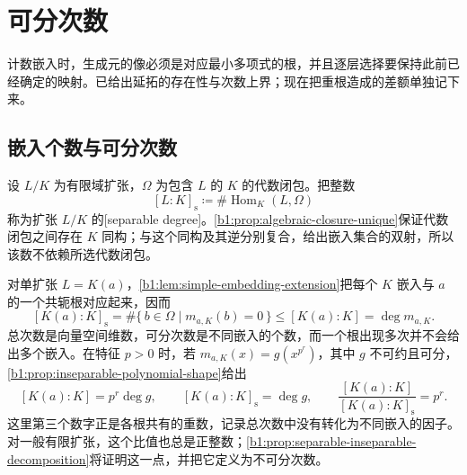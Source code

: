 
\section{可分次数}
\label{b1:sec:1602}


%
%

计数嵌入时，生成元的像必须是对应最小多项式的根，并且逐层选择要保持此前已经确定的映射。已给出延拓的存在性与次数上界；现在把重根造成的差额单独记下来。

\subsection{嵌入个数与可分次数}
\label{b1:subsec:1602:01}

\begin{definition}\label{b1:def:separable-degree}
	设 \(L/K\) 为有限域扩张，\(\Omega\) 为包含 \(L\) 的 \(K\) 的代数闭包。把整数
	\[
		[L:K]_{\mathrm s}\coloneqq\#\operatorname{Hom}_K(L,\Omega)
	\]
	称为扩张 \(L/K\) 的[separable degree]。\cref{b1:prop:algebraic-closure-unique}保证代数闭包之间存在 \(K\) 同构；与这个同构及其逆分别复合，给出嵌入集合的双射，所以该数不依赖所选代数闭包。
\end{definition}

对单扩张 \(L=K(a)\)，\cref{b1:lem:simple-embedding-extension}把每个 \(K\) 嵌入与 \(a\) 的一个共轭根对应起来，因而
\[
	[K(a):K]_{\mathrm s} =\#\{\,b\in\Omega\mid m_{a,K}(b)=0\,\} \leq[K(a):K]=\deg m_{a,K}.
\]
总次数是向量空间维数，可分次数是不同嵌入的个数，而一个根出现多次并不会给出多个嵌入。在特征 \(p>0\) 时，若 \(m_{a,K}(x)=g(x^{p^r})\)，其中 \(g\) 不可约且可分，\cref{b1:prop:inseparable-polynomial-shape}给出
\[
	[K(a):K]=p^r\deg g,\qquad [K(a):K]_{\mathrm s}=\deg g,\qquad \frac{[K(a):K]}{[K(a):K]_{\mathrm s}}=p^r.
\]
这里第三个数字正是各根共有的重数，记录总次数中没有转化为不同嵌入的因子。对一般有限扩张，这个比值也总是正整数；\cref{b1:prop:separable-inseparable-decomposition}将证明这一点，并把它定义为不可分次数。

